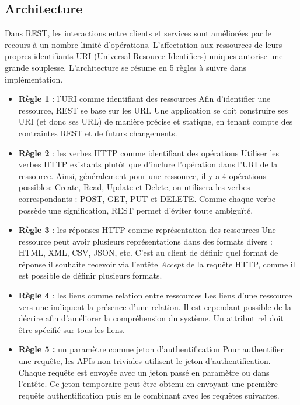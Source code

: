 \subsection{Architecture}
Dans REST, les interactions entre clients et services sont améliorées par le recours à un nombre limité d'opérations. L'affectation aux ressources de leurs propres identifiants URI (Universal Resource Identifiers) uniques autorise une grande souplesse. L'architecture se résume en 5 règles à suivre dans implémentation.\cite{refRegles}
\begin{itemize}
	\item \textbf{Règle 1} : l'URI comme identifiant des ressources\newline
	      Afin d'identifier une ressource, REST se base sur les URI. Une application se doit construire ses URI (et donc ses URL) de manière précise et statique, en tenant compte des contraintes REST et de futurs changements.
	\item \textbf{Règle 2} : les verbes HTTP comme identifiant des opérations\newline
	      Utiliser les verbes HTTP existants plutôt que d'inclure l'opération dans l'URI de la ressource. Ainsi, généralement pour une ressource, il y a 4 opérations possibles: Create, Read, Update et Delete, on utilisera les verbes correspondants : POST, GET, PUT et DELETE.
	      Comme chaque verbe possède une signification, REST permet d'éviter toute ambiguïté.
	\item \textbf{Règle 3} : les réponses HTTP comme représentation des ressources\newline
	      Une ressource peut avoir plusieurs représentations dans des formats divers : HTML, XML, CSV, JSON, etc. C'est au client de définir quel format de réponse il souhaite recevoir via l'entête \emph{Accept} de la requête HTTP, comme il est possible de définir plusieurs formats.
	\item \textbf{Règle 4} : les liens comme relation entre ressources\newline
	      Les liens d'une ressource vers une indiquent la présence d'une relation. Il est cependant possible de la décrire afin d'améliorer la compréhension du système. Un attribut rel doit être spécifié sur tous les liens.
	\item \textbf{Règle 5 :} un paramètre comme jeton d'authentification\newline
	      Pour authentifier une requête, les APIs non-triviales utilisent le jeton d'authentification. Chaque requête est envoyée avec un jeton passé en paramètre ou dans l'entête. Ce jeton temporaire peut être obtenu en envoyant une première requête authentification puis en le combinant avec les requêtes suivantes.
\end{itemize}
